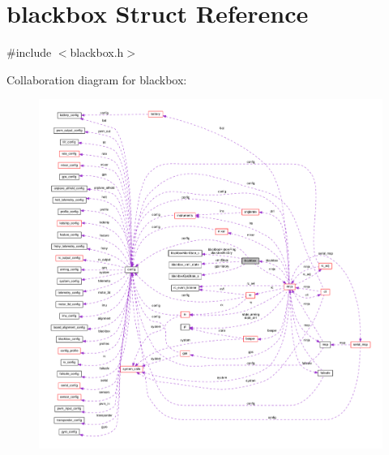 \hypertarget{structblackbox}{\section{blackbox Struct Reference}
\label{structblackbox}
}


{\ttfamily \#include $<$blackbox.\+h$>$}



Collaboration diagram for blackbox\+:
\nopagebreak
\begin{figure}[H]
\begin{center}
\leavevmode
\includegraphics[width=350pt]{structblackbox__coll__graph}
\end{center}
\end{figure}
